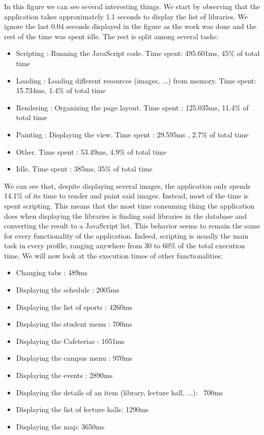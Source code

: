 \documentclass{eplmastersthesis}
\begin{document}
In this figure we can see several interesting things. We start by observing that the application takes approximately 1.1 seconds to display the list of libraries. We ignore the last 0.04 seconds displayed in the figure as the work was done and the rest of the time was spent idle. The rest is split among several tasks:
\begin{itemize}
\item Scripting : Running the JavaScript code. Time spent: 495.601ms, 45\% of total time
\item Loading : Loading different resources (images, ...) from memory. Time spent: 15.734ms, 1.4\% of total time
\item Rendering : Organizing the page layout. Time spent : 125.035ms, 11.4\% of total time
\item Painting : Displaying the view. Time spent : 29.595ms , 2.7\% of total time
\item Other. Time spent : 53.49ms, 4.9\% of total time
\item Idle. Time spent : 385ms, 35\% of total time
\end{itemize}
We can see that, despite displaying several images, the application only spends 14.1\% of its time to render and paint said images. Instead, most of the time is spent scripting. This means that the most time consuming thing the application does when displaying the libraries is finding said libraries in the database and converting the result to a JavaScript list. This behavior seems to remain the same for every functionality of the application. Indeed, scripting is usually the main task in every profile, ranging anywhere from 30 to 60\% of the total execution time. 
We will now look at the execution times of other functionalities: 
\begin{itemize}
\item Changing tabs : 489ms
\item Displaying the schedule : 2005ms
\item Displaying the list of sports : 4260ms
\item Displaying the student menu : 700ms
\item Displaying the Cafeterias : 1051ms
\item Displaying the campus menu : 970ms
\item Displaying the events : 2890ms
\item Displaying the details of an item (library, lecture hall, ...): ~700ms
\item Displaying the list of lecture halls: 1290ms
\item Displaying the map: 3650ms
\end{itemize}  
\end{document}
